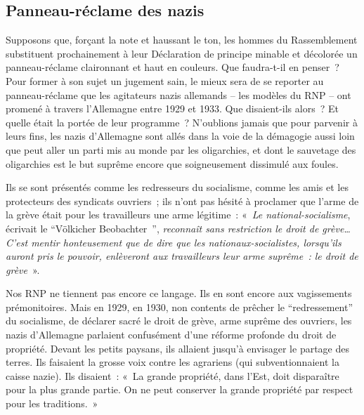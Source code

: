 \documentclass[french,twoside]{book} %
\begin{document}
\subsection[Panneau-réclame des nazis]{Panneau-réclame des nazis}
\noindent Supposons que, forçant la note et haussant le ton, les hommes du Rassemblement substituent prochainement à leur Déclaration de principe minable et décolorée un panneau-réclame claironnant et haut en couleurs. Que faudra-t-il en penser ? Pour former à son sujet un jugement sain, le mieux sera de se reporter au panneau-réclame que les agitateurs nazis allemands – les modèles du RNP – ont promené à travers l’Allemagne entre 1929 et 1933. Que disaient-ils alors ? Et quelle était la portée de leur programme ? N’oublions jamais que pour parvenir à leurs fins, les nazis d’Allemagne sont allés dans la voie de la démagogie aussi loin que peut aller un parti mis au monde par les oligarchies, et dont le sauvetage des oligarchies est le but suprême encore que soigneusement dissimulé aux foules.\par
Ils se sont présentés comme les redresseurs du socialisme, comme les amis et les protecteurs des syndicats ouvriers ; ils n’ont pas hésité à proclamer que l’arme de la grève était pour les travailleurs une arme légitime : « \emph{Le national-socialisme}, écrivait le “Völkicher Beobachter ”, \emph{reconnaît sans restriction le droit de grève… C’est mentir honteusement que de dire que les nationaux-socialistes, lorsqu’ils auront pris le pouvoir, enlèveront aux travailleurs leur arme suprême : le droit de grève} ».\par
Nos RNP ne tiennent pas encore ce langage. Ils en sont encore aux vagissements prémonitoires. Mais en 1929, en 1930, non contents de prêcher le “redressement” du socialisme, de déclarer sacré le droit de grève, arme suprême des ouvriers, les nazis d’Allemagne parlaient confusément d’une réforme profonde du droit de propriété. Devant les petits paysans, ils allaient jusqu’à envisager le partage des terres. Ils faisaient la grosse voix contre les agrariens (qui subventionnaient la caisse nazie). Ils disaient : « La grande propriété, dans l’Est, doit disparaître pour la plus grande partie. On ne peut conserver la grande propriété par respect pour les traditions. »
\end{document}
